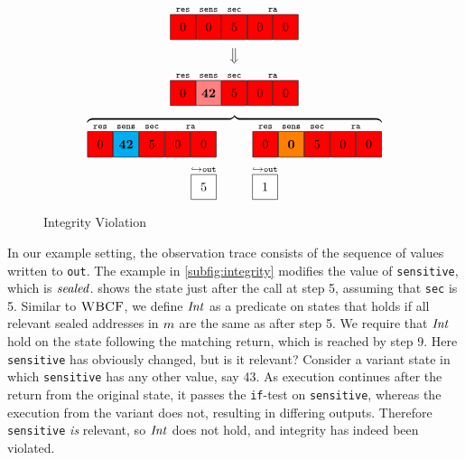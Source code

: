 \documentclass[10pt,conference]{ieeetran}%
\theoremstyle{definition}
\begin{document}
\newcommand{\figfourbox}[1][]{\genbox{20px}{red}{#1}}

\begin{figure}
  \centering
  \[
  \stackrel{\texttt{res}}{\figfourbox[0]}
  \stackrel{\texttt{sens}}{\figfourbox[0]}
  \stackrel{\texttt{sec}}{\figfourbox[5]}
  \stackrel{\texttt{ra}}{\figfourbox[0]\figfourbox[0]}\]
  \[\big\Downarrow\]
  \[
  \stackrel{\texttt{res}}{\figfourbox[0]}
  \stackrel{\texttt{sens}}{\genbox{20px}{red!50}{\bf 42}}
  \stackrel{\texttt{sec}}{\figfourbox[5]}
  \stackrel{\texttt{ra}}{\figfourbox[0]\figfourbox[0]}\]
  \[\overbrace{
    \stackrel{\texttt{res}}{\figfourbox[0]}
    \stackrel{\texttt{sens}}{\genbox{20px}{\leftvariant}{\bf 42}}
    \stackrel{\texttt{sec}}{\figfourbox[5]}
    \stackrel{\texttt{ra}}{\figfourbox[0]\figfourbox[0]}
    \hspace{1cm}
    \stackrel{\texttt{res}}{\figfourbox[0]}
    \stackrel{\texttt{sens}}{\genbox{20px}{\rightvariant}{\bf 0}}
    \stackrel{\texttt{sec}}{\figfourbox[5]}
    \stackrel{\texttt{ra}}{\figfourbox[0]\figfourbox[0]}}\]
  \[\stackrel{\hookrightarrow \mathtt{out}}{\genbox{20px}{white}{5}} \hspace{0.5cm}
  \hspace{0.5cm}
  \stackrel{\hookrightarrow \mathtt{out}}{\genbox{20px}{white}{1}}\]
  \caption{Integrity Violation}
  \label{fig:variant}
\end{figure}

In our example setting, the observation trace consists of the sequence
of values written to {\tt out}.
The example in \cref{subfig:integrity} modifies the value of {\tt sensitive},
which is \(\mathit{sealed}\).  shows the state just after the call at step 5,
assuming that {\tt sec} is 5. Similar to \(\textnormal{\sc WBCF}\), we define
\(\mathit{Int}\) as a predicate on states that holds if
all relevant sealed addresses in \(m\) are the same as after step 5.
We require that \(\mathit{Int}\) hold on the state following the matching return,
which is reached by step 9. Here {\tt sensitive} has obviously changed, but is it relevant?
Consider a variant state in which {\tt sensitive} has any other value, %
say 43. As execution continues after the return
from the original state, it passes the {\tt if}-test on {\tt sensitive}, whereas the execution
from the variant does not, resulting in differing outputs. Therefore {\tt sensitive} \emph{is} relevant,
so \(\mathit{Int}\) does not hold, and integrity has indeed been violated.
\end{document}

